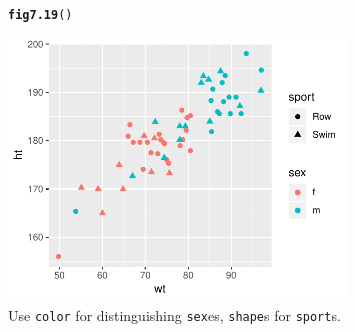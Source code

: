 \documentclass[12pt, a4paper,  BCOR=8.25mm, DIV=15]{scrartcl}\usepackage[]{graphicx}\usepackage[]{color}
\makeatletter
\newcommand{\hlstd}[1]{\textcolor[rgb]{0.345,0.345,0.345}{#1}}%
\newcommand{\hlkwd}[1]{\textcolor[rgb]{0.737,0.353,0.396}{\textbf{#1}}}%
\newenvironment{kframe}{%
 \def\at@end@of@kframe{}%
 \ifinner\ifhmode%
  \def\at@end@of@kframe{\end{minipage}}%
  \begin{minipage}{\columnwidth}%
 \fi\fi%
 \def\FrameCommand##1{\hskip\@totalleftmargin \hskip-\fboxsep
 \colorbox{shadecolor}{##1}\hskip-\fboxsep
     \hskip-\linewidth \hskip-\@totalleftmargin \hskip\columnwidth}%
 \MakeFramed {\advance\hsize-\width
   \@totalleftmargin\z@ \linewidth\hsize
   \@setminipage}}%
 {\par\unskip\endMakeFramed%
 \at@end@of@kframe}
\newenvironment{knitrout}{}{} %
\makeatother
\begin{document}
\begin{figure}[ht]
\begin{knitrout}
\color{fgcolor}\begin{kframe}
\begin{alltt}
\hlkwd{fig7.19}\hlstd{()}
\end{alltt}
\end{kframe}

{\centering \includegraphics[width=0.8\textwidth]{figure/gph-fig7_19e-1} 

}



\end{knitrout}
\caption{Use \texttt{color} for distinguishing \texttt{sex}es,
\texttt{shape}s for \texttt{sport}s.}\label{fig:colshape}
\end{figure}
\end{document}

